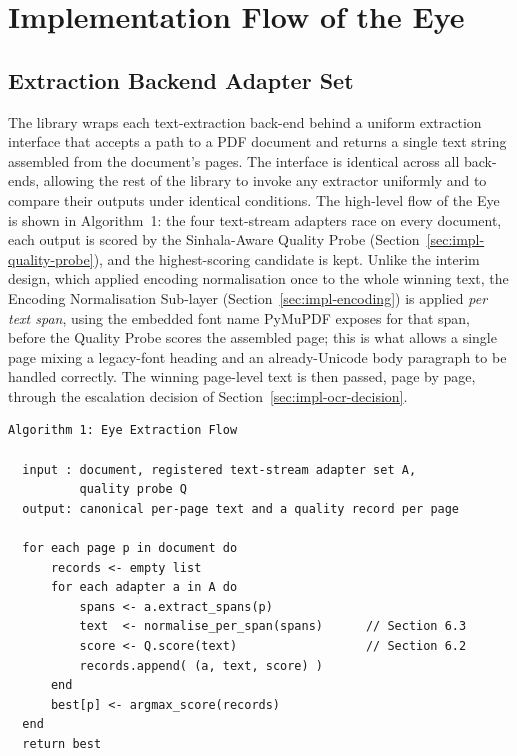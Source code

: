 \documentclass[12pt,a4paper,oneside]{report}
\begin{document}
\section{Implementation Flow of the Eye}
\label{sec:impl-eye}

\subsection{Extraction Backend Adapter Set}
\label{sec:impl-adapters}
The library wraps each text-extraction back-end behind a uniform extraction interface that accepts a path to a PDF document and returns a single text string assembled from the document's pages. The interface is identical across all back-ends, allowing the rest of the library to invoke any extractor uniformly and to compare their outputs under identical conditions. The high-level flow of the Eye is shown in Algorithm~1: the four text-stream adapters race on every document, each output is scored by the Sinhala-Aware Quality Probe (Section~\ref{sec:impl-quality-probe}), and the highest-scoring candidate is kept. Unlike the interim design, which applied encoding normalisation once to the whole winning text, the Encoding Normalisation Sub-layer (Section~\ref{sec:impl-encoding}) is applied \textit{per text span}, using the embedded font name PyMuPDF exposes for that span, before the Quality Probe scores the assembled page; this is what allows a single page mixing a legacy-font heading and an already-Unicode body paragraph to be handled correctly. The winning page-level text is then passed, page by page, through the escalation decision of Section~\ref{sec:impl-ocr-decision}.

\begin{verbatim}
Algorithm 1: Eye Extraction Flow

  input : document, registered text-stream adapter set A,
          quality probe Q
  output: canonical per-page text and a quality record per page

  for each page p in document do
      records <- empty list
      for each adapter a in A do
          spans <- a.extract_spans(p)
          text  <- normalise_per_span(spans)      // Section 6.3
          score <- Q.score(text)                  // Section 6.2
          records.append( (a, text, score) )
      end
      best[p] <- argmax_score(records)
  end
  return best
\end{verbatim}
\end{document}
